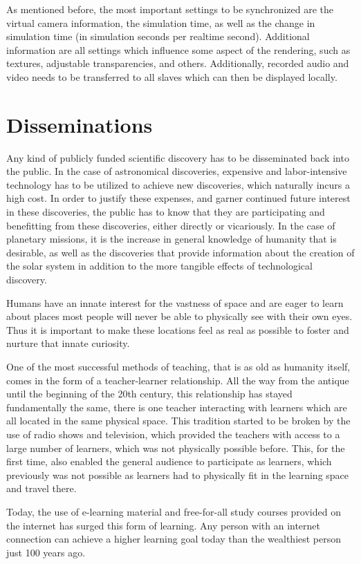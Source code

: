 \documentclass{vgtc}                %
\begin{document}
As mentioned before, the most important settings to be synchronized are the virtual camera information, the simulation time, as well as the change in simulation time (in simulation seconds per realtime second). Additional information are all settings which influence some aspect of the rendering, such as textures, adjustable transparencies, and others. Additionally, recorded audio and video needs to be transferred to all slaves which can then be displayed locally.

\section*{Disseminations}
Any kind of publicly funded scientific discovery has to be disseminated back into the public. In the case of astronomical discoveries, expensive and labor-intensive technology has to be utilized to achieve new discoveries, which naturally incurs a high cost. In order to justify these expenses, and garner continued future interest in these discoveries, the public has to know that they are participating and benefitting from these discoveries, either directly or vicariously. In the case of planetary missions, it is the increase in general knowledge of humanity that is desirable, as well as the discoveries that provide information about the creation of the solar system in addition to the more tangible effects of technological discovery.

Humans have an innate interest for the vastness of space and are eager to learn about places most people will never be able to physically see with their own eyes. Thus it is important to make these locations feel as real as possible to foster and nurture that innate curiosity.

One of the most successful methods of teaching, that is as old as humanity itself, comes in the form of a teacher-learner relationship. All the way from the antique until the beginning of the 20th century, this relationship has stayed fundamentally the same, there is one teacher interacting with learners which are all located in the same physical space. This tradition started to be broken by the use of radio shows and television, which provided the teachers with access to a large number of learners, which was not physically possible before. This, for the first time, also enabled the general audience to participate as learners, which previously was not possible as learners had to physically fit in the learning space and travel there.

Today, the use of e-learning material and free-for-all study courses provided on the internet has surged this form of learning. Any person with an internet connection can achieve a higher learning goal today than the wealthiest person just 100 years ago.
\end{document}
